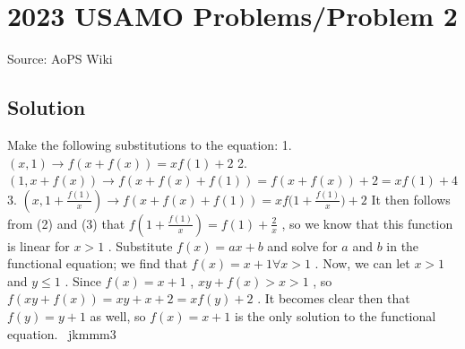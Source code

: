 \documentclass[12pt]{article}
\begin{document}
\section*{{2023 USAMO Problems/Problem 2}}
Source: AoPS Wiki

\subsection*{Solution}
Make the following substitutions to the equation: 1. $(x, 1) \rightarrow f(x + f(x)) = xf(1) + 2$ 2. $(1, x + f(x)) \rightarrow f(x + f(x) + f(1)) = f(x + f(x)) + 2 = xf(1) + 4$ 3. $(x, 1 + \frac{f(1)}{x}) \rightarrow f(x + f(x) + f(1)) = xf\biggl(1 + \frac{f(1)}{x}\biggr) + 2$ It then follows from (2) and (3) that $f(1 + \frac{f(1)}{x}) = f(1) + \frac{2}{x}$ , so we know that this function is linear for $x > 1$ . Substitute $f(x) = ax+b$ and solve for $a$ and $b$ in the functional equation; we find that $f(x) = x + 1 \forall x > 1$ . Now, we can let $x > 1$ and $y \le 1$ . Since $f(x) = x + 1$ , $xy + f(x) > x > 1$ , so $f(xy + f(x)) = xy + x + 2 = xf(y) + 2$ . It becomes clear then that $f(y) = y + 1$ as well, so $f(x) = x + 1$ is the only solution to the functional equation. ~jkmmm3
\end{document}
